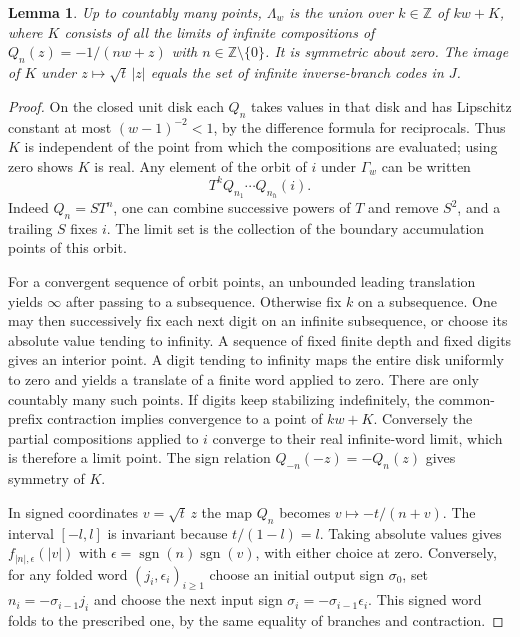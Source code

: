 \documentclass[11pt]{article}
\newtheorem{lemma}[theorem]{Lemma}
\newcommand{\Z}{\mathbb Z}
\begin{document}
\begin{lemma}\label{coding}
Up to countably many points, $\Lambda_w$ is the union over $k\in\Z$ of $kw+K$, where $K$ consists of all the limits of infinite compositions of $Q_n(z)=-1/(nw+z)$ with $n\in\Z\setminus\{0\}$. It is symmetric about zero. The image of $K$ under $z\mapsto\sqrt t\,|z|$ equals the set of infinite inverse-branch codes in $J$.
\end{lemma}
\begin{proof}
On the closed unit disk each $Q_n$ takes values in that disk and has Lipschitz constant at most $(w-1)^{-2}<1$, by the difference formula for reciprocals. Thus $K$ is independent of the point from which the compositions are evaluated; using zero shows $K$ is real. Any element of the orbit of $i$ under $\Gamma_w$ can be written
\[
 T^k Q_{n_1}\cdots Q_{n_h}(i).
\]
Indeed $Q_n=ST^n$, one can combine successive powers of $T$ and remove $S^2$, and a trailing $S$ fixes $i$. The limit set is the collection of the boundary accumulation points of this orbit.

For a convergent sequence of orbit points, an unbounded leading translation yields $\infty$ after passing to a subsequence. Otherwise fix $k$ on a subsequence. One may then successively fix each next digit on an infinite subsequence, or choose its absolute value tending to infinity. A sequence of fixed finite depth and fixed digits gives an interior point. A digit tending to infinity maps the entire disk uniformly to zero and yields a translate of a finite word applied to zero. There are only countably many such points. If digits keep stabilizing indefinitely, the common-prefix contraction implies convergence to a point of $kw+K$. Conversely the partial compositions applied to $i$ converge to their real infinite-word limit, which is therefore a limit point. The sign relation $Q_{-n}(-z)=-Q_n(z)$ gives symmetry of $K$.

In signed coordinates $v=\sqrt t\,z$ the map $Q_n$ becomes $v\mapsto -t/(n+v)$. The interval $[-l,l]$ is invariant because $t/(1-l)=l$. Taking absolute values gives $f_{|n|,\epsilon}(|v|)$ with $\epsilon=\operatorname{sgn}(n)\operatorname{sgn}(v)$, with either choice at zero. Conversely, for any folded word $(j_i,\epsilon_i)_{i\ge1}$ choose an initial output sign $\sigma_0$, set $n_i=-\sigma_{i-1}j_i$ and choose the next input sign $\sigma_i=-\sigma_{i-1}\epsilon_i$. This signed word folds to the prescribed one, by the same equality of branches and contraction.
\end{proof}
\end{document}
